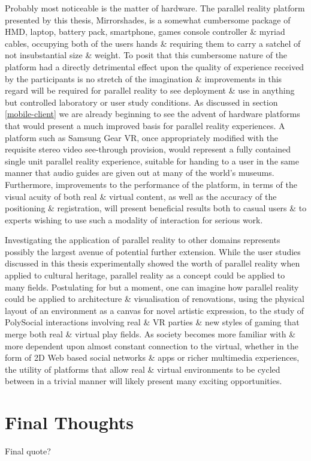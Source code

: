 Probably most noticeable is the matter of hardware. The parallel reality platform presented by this thesis, Mirrorshades, is a somewhat cumbersome package of HMD, laptop, battery pack, smartphone, games console controller \& myriad cables, occupying both of the users hands \& requiring them to carry a satchel of not insubstantial size \& weight. To posit that this cumbersome nature of the platform had a directly detrimental effect upon the quality of experience received by the participants is no stretch of the imagination \& improvements in this regard will be required for parallel reality to see deployment \& use in anything but controlled laboratory or user study conditions. As discussed in section \ref{mobile-client} we are already beginning to see the advent of hardware platforms that would present a much improved basis for parallel reality experiences. A platform such as Samsung Gear VR, once appropriately modified with the requisite stereo video see-through provision, would represent a fully contained single unit parallel reality experience, suitable for handing to a user in the same manner that audio guides are given out at many of the world's museums. Furthermore, improvements to the performance of the platform, in terms of the visual acuity of both real \& virtual content, as well as the accuracy of the positioning \& registration, will present beneficial results both to casual users \& to experts wishing to use such a modality of interaction for serious work.

Investigating the application of parallel reality to other domains represents possibly the largest avenue of potential further extension. While the user studies discussed in this thesis experimentally showed the worth of parallel reality when applied to cultural heritage, parallel reality as a concept could be applied to many fields. Postulating for but a moment, one can imagine how parallel reality could be applied to architecture \& visualisation of renovations, using the physical layout of an environment as a canvas for novel artistic expression, to the study of PolySocial interactions involving real \& VR parties \& new styles of gaming that merge both real \& virtual play fields. As society becomes more familiar with \& more dependent upon almost constant connection to the virtual, whether in the form of 2D Web based social networks \& apps or richer multimedia experiences, the utility of platforms that allow real \& virtual environments to be cycled between in a trivial manner will likely present many exciting opportunities.




\section{Final Thoughts}

Final quote?

